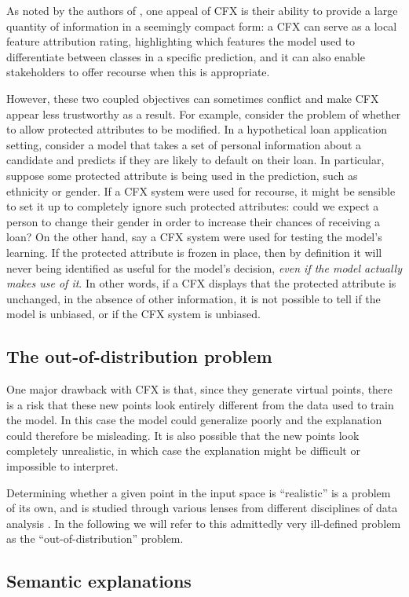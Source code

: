 \documentclass[../main.tex]{subfiles}
\begin{document}
As noted by the authors of \cite{wachterCounterfactual2017}, one appeal of CFX is their ability to provide a large quantity of information in a seemingly compact form:
a CFX can serve as a local feature attribution rating, highlighting which features the model used to differentiate between classes in a specific prediction, and it can also enable stakeholders to offer recourse when this is appropriate.

However, these two coupled objectives can sometimes conflict and make CFX appear less trustworthy as a result.
For example, consider the problem of whether to allow protected attributes to be modified.
In a hypothetical loan application setting, consider a model that takes a set of personal information about a candidate and predicts if they are likely to default on their loan.
In particular, suppose some protected attribute is being used in the prediction, such as ethnicity or gender.
If a CFX system were used for recourse, it might be sensible to set it up to completely ignore such protected attributes: could we expect a person to change their gender in order to increase their chances of receiving a loan?
On the other hand, say a CFX system were used for testing the model's learning. If the protected attribute is frozen in place, then by definition it will never being identified as useful for the model's decision, \emph{even if the model actually makes use of it}.
In other words, if a CFX displays that the protected attribute is unchanged, in the absence of other information, it is not possible to tell if the model is unbiased, or if the CFX system is unbiased.

\subsection{The out-of-distribution problem}

One major drawback with CFX is that, since they generate virtual points, there is a risk that these new points look entirely different from the data used to train the model.
In this case the model could generalize poorly and the explanation could therefore be misleading.
It is also possible that the new points look completely unrealistic, in which case the explanation might be difficult or impossible to interpret.


Determining whether a given point in the input space is ``realistic'' is a problem of its own, and is studied through various lenses from different disciplines of data analysis \cite{yangGeneralized2022}.
In the following we will refer to this admittedly very ill-defined problem as the ``out-of-distribution'' problem.

\subsection{Semantic explanations}
\end{document}
